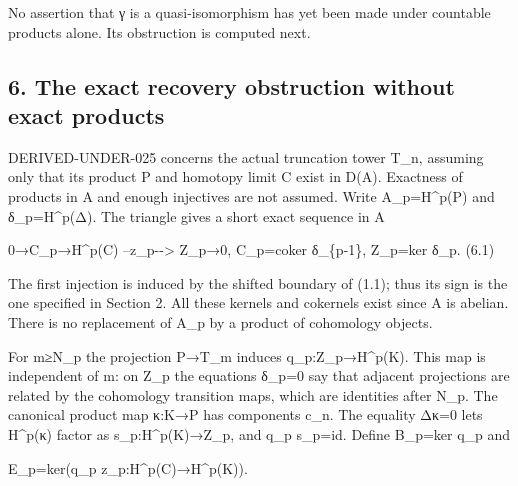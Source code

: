 No assertion that γ is a quasi-isomorphism has yet been made under countable products alone. Its obstruction is computed next.

\subsection{6. The exact recovery obstruction without exact products}\label{proofs-10435-10686-the-exact-recovery-obstruction-without-exact-products}

DERIVED-UNDER-025 concerns the actual truncation tower T\_\allowbreak{}n,\allowbreak{} assuming only that its product P and homotopy limit C exist in D(A)\allowbreak{}. Exactness of products in A and enough injectives are not assumed. Write A\_\allowbreak{}p\allowbreak{}=H\textasciicircum{}p(P)\allowbreak{} and δ\_\allowbreak{}p\allowbreak{}=H\textasciicircum{}p(Δ)\allowbreak{}. The triangle gives a short exact sequence in A

0\allowbreak{}→C\_\allowbreak{}p\allowbreak{}→H\textasciicircum{}p(C)\allowbreak{} --z\_\allowbreak{}p-\allowbreak{}-> Z\_\allowbreak{}p\allowbreak{}→0,\allowbreak{} C\_\allowbreak{}p\allowbreak{}=coker δ\_\allowbreak{}\{p-1\},\allowbreak{} Z\_\allowbreak{}p\allowbreak{}=ker δ\_\allowbreak{}p. (6.1)\allowbreak{}

The first injection is induced by the shifted boundary of (1.1)\allowbreak{}; thus its sign is the one specified in Section 2. All these kernels and cokernels exist since A is abelian. There is no replacement of A\_\allowbreak{}p by a product of cohomology objects.

For m≥N\_\allowbreak{}p the projection P\allowbreak{}→T\_\allowbreak{}m induces q\_\allowbreak{}p:\allowbreak{}Z\_\allowbreak{}p\allowbreak{}→H\textasciicircum{}p(K)\allowbreak{}. This map is independent of m:\allowbreak{} on Z\_\allowbreak{}p the equations δ\_\allowbreak{}p\allowbreak{}=0 say that adjacent projections are related by the cohomology transition maps,\allowbreak{} which are identities after N\_\allowbreak{}p. The canonical product map κ:\allowbreak{}K\allowbreak{}→P has components c\_\allowbreak{}n. The equality Δκ\allowbreak{}=0 lets H\textasciicircum{}p(κ)\allowbreak{} factor as s\_\allowbreak{}p:\allowbreak{}H\textasciicircum{}p(K)\allowbreak{}\allowbreak{}→Z\_\allowbreak{}p,\allowbreak{} and q\_\allowbreak{}p s\_\allowbreak{}p\allowbreak{}=id. Define B\_\allowbreak{}p\allowbreak{}=ker q\_\allowbreak{}p and

E\_\allowbreak{}p\allowbreak{}=ker(q\_\allowbreak{}p z\_\allowbreak{}p:\allowbreak{}H\textasciicircum{}p(C)\allowbreak{}\allowbreak{}→H\textasciicircum{}p(K)\allowbreak{})\allowbreak{}.

